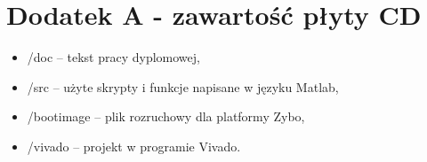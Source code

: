 \chapter{Dodatek A - zawartość płyty CD}
\begin{itemize}
\item /doc -- tekst pracy dyplomowej,
\item /src -- użyte skrypty i funkcje napisane w języku Matlab,
\item /bootimage -- plik rozruchowy dla platformy Zybo,
\item /vivado -- projekt w programie Vivado.
\end{itemize}








